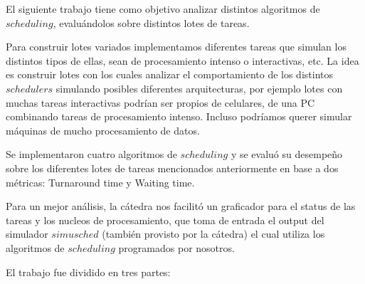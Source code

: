 El siguiente trabajo tiene como objetivo analizar distintos algoritmos de $scheduling$, evaluándolos sobre distintos lotes de tareas. 

Para construir lotes variados implementamos diferentes tareas que simulan los distintos tipos de ellas, sean de procesamiento intenso o interactivas, etc. La idea es construir lotes con los cuales analizar el comportamiento de los distintos $schedulers$ simulando posibles diferentes arquitecturas, por ejemplo lotes con muchas tareas interactivas podrían ser propios de celulares, de una PC combinando tareas de procesamiento intenso. Incluso podríamos querer simular máquinas de mucho procesamiento de datos.

Se implementaron cuatro algoritmos de $scheduling$ y se evaluó su desempeño sobre los diferentes lotes de tareas mencionados anteriormente en base a dos métricas: Turnaround time y Waiting time.

Para un mejor análisis, la cátedra nos facilitó un graficador para el status de las tareas y los nucleos de procesamiento, que toma de entrada el output del simulador $simusched$ (también provisto por la cátedra) el cual utiliza los algoritmos de $scheduling$ programados por nosotros.

El trabajo fue dividido en tres partes:
